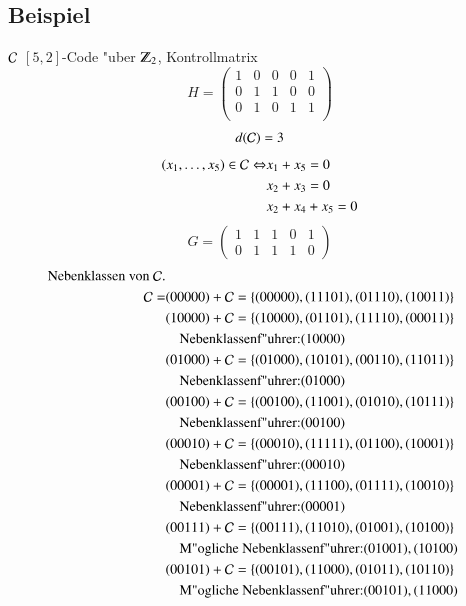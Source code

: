 \subsection{Beispiel}
$\mathcal{C}$ $[5,2]$-Code "uber $\Z_2$, Kontrollmatrix
\[
	H=
	\begin{pmatrix}
		1 & 0 & 0 & 0 & 1\\
		0 & 1 & 1 & 0 & 0\\
		0 & 1 & 0 & 1 & 1\\
	\end{pmatrix}
\]
\[d(\mathcal{C})=3\]
\begin{align*}
(x_1,\ldots,x_5) \in \mathcal{C} \Leftrightarrow &x_1+x_5 = 0\\
& x_2+x_3=0\\
&x_2+x_4+x_5=0
\end{align*}
\[
	G=
	\begin{pmatrix}
		1 & 1 & 1 & 0 & 1\\
		0 & 1 & 1 & 1 &0
	\end{pmatrix}
\]
\begin{align*}
\text{Nebenklassen von } \mathcal{C}.\\
\mathcal{C} = &(00000) + \mathcal{C} = \lbrace (00000),(11101),(01110),(10011) \rbrace\\
					  &(10000) + \mathcal{C} = \lbrace (10000),(01101),(11110),(00011) \rbrace\\
					  &\quad \text{Nebenklassenf"uhrer:} (10000)\\
					  &(01000) + \mathcal{C} = \lbrace (01000),(10101),(00110),(11011) \rbrace\\
					  &\quad \text{Nebenklassenf"uhrer:} (01000)\\
					  &(00100) + \mathcal{C} = \lbrace (00100),(11001),(01010),(10111) \rbrace\\
					  &\quad \text{Nebenklassenf"uhrer:} (00100)\\
					  &(00010) + \mathcal{C} = \lbrace (00010),(11111),(01100),(10001) \rbrace\\
					  &\quad \text{Nebenklassenf"uhrer:} (00010)\\
					  &(00001) + \mathcal{C} = \lbrace (00001),(11100),(01111),(10010) \rbrace\\
					  &\quad \text{Nebenklassenf"uhrer:} (00001)\\
					  &(00111) + \mathcal{C} = \lbrace (00111),(11010),(01001),(10100) \rbrace\\
					  &\quad \text{M"ogliche Nebenklassenf"uhrer:} (01001), (10100)\\
					  &(00101) + \mathcal{C} = \lbrace (00101),(11000),(01011),(10110) \rbrace\\
					  &\quad \text{M"ogliche Nebenklassenf"uhrer:} (00101), (11000)\\
\end{align*}
